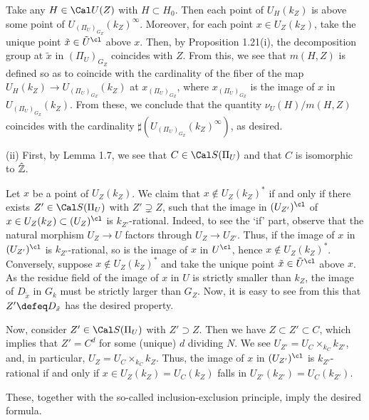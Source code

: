 Take any $H\in{\Cal U}(Z)$ with $H\subset H_0$. Then 
each point of $U_H(k_Z)$ is above some point of 
$U_{(\Pi_U)_{G_Z}}(k_Z)^{\infty}$. Moreover, for each point 
$x\in U_Z(k_Z)$, take the unique point ${\tilde x}\in {\tilde U}^{\cl}$ 
above $x$. Then, by Proposition 1.21(i), the decomposition group at 
$\tilde x$ in $(\Pi_U)_{G_Z}$ coincides with $Z$. From this, we see that 
$m(H,Z)$ is defined so as to coincide with the cardinality of 
the fiber of the map $U_H(k_Z)\to U_{(\Pi_U)_{G_Z}}(k_Z)$ at $x_{(\Pi_U)_{G_Z}}$, 
where $x_{(\Pi_U)_{G_Z}}$ is the image of 
$x$ in $U_{(\Pi_U)_{G_Z}}(k_Z)$. From these, we conclude that the quantity 
$\nu_U(H)/m(H,Z)$ coincides with the cardinality 
$\sharp(U_{(\Pi_U)_{G_Z}}(k_Z)^{\infty})$, 
as desired. 

\noindent
(ii) 
First, by Lemma 1.7, we see that $C\in{\Cal S}(\Pi_U)$ and
that $C$ is isomorphic to $\hat{\Bbb Z}$. 

Let $x$ be a point of $U_Z(k_Z)$. We claim that 
$x\not\in U_Z(k_Z)^\ast$ if and only if there exists 
$Z'\in{\Cal S}(\Pi_U)$ with $Z'\supsetneq Z$, such that 
the image in $(U_{Z'})^{\cl}$ of $x\in U_Z(k_Z)\subset (U_Z)^{\cl}$ 
is $k_{Z'}$-rational. Indeed, to see the `if' part, 
observe that the natural morphism $U_Z\to U$ factors through 
$U_Z \to U_{Z'}$. Thus, if the image of $x$ in 
$(U_{Z'})^{\cl}$ is $k_{Z'}$-rational, so is the image of $x$ in 
$U^{\cl}$, hence $x\not\in U_Z(k_Z)^\ast$. Conversely, suppose 
$x\not\in U_Z(k_Z)^\ast$ and take 
the unique point ${\tilde x}\in {\tilde U}^{\cl}$ above $x$. 
As the residue field of the image of $x$ in $U$ is strictly smaller 
than $k_Z$, the image of $D_{\tilde x}$ in $G_{k}$ must be strictly 
larger than $G_Z$. Now, it is easy to see from this that 
$Z'\defeq D_{\tilde x}$ has the desired property. 

Now, consider $Z'\in{\Cal S}(\Pi_U)$ with $Z'\supset Z$. 
Then we have $Z\subset Z'\subset C$, 
which implies that $Z'=C^d$ for some (unique) 
$d$ dividing $N$. 
We see $U_{Z'}= U_C \times_{k_{C}}k_{Z'}$, and, 
in particular, $U_{Z}= U_C \times_{k_{C}}k_{Z}$. 
Thus, 
the image of $x$ in $(U_{Z'})^{\cl}$ is $k_{Z'}$-rational 
if and only if $x\in U_Z(k_Z)=U_{C}(k_Z)$ falls in 
$U_{Z'}(k_{Z'})=U_C(k_{Z'})$. 

These, together with the so-called inclusion-exclusion principle, 
imply the desired formula. 

